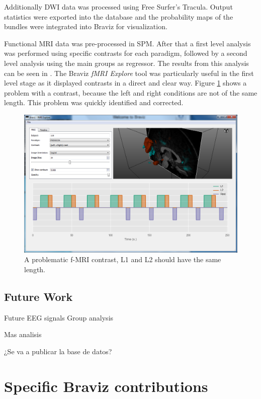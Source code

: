 Additionally DWI data was processed using Free Surfer's Tracula. Output statistics were exported into the database and the probability maps of the bundles were integrated into Braviz for visualization. 

Functional MRI data was pre-processed in SPM.  After that a first level analysis was performed using specific contrasts for each paradigm, followed by a second level analysis using the main groups as regressor. The results from this analysis can be seen in \autocite{PABLO_FELIPE}. The Braviz \emph{fMRI Explore} tool was particularly useful in the first level stage as it displayed contrasts in a direct and clear way. Figure \ref{fig_spm_contrast_error} shows a problem with a contrast, because the left and right conditions are not of the same length. This problem was quickly identified and corrected.

\begin{figure}
	\centering
		\includegraphics{figures/kmc400/erroro_fmri2}
	\caption{A problematic f-MRI contrast, L1 and L2 should have the same length.}
	\label{fig_spm_contrast_error}
\end{figure}
 

\subsection{Future Work}

Future
EEG signals
Group analysis

Mas analisis

¿Se va a publicar la base de datos?


\section{Specific Braviz contributions}

